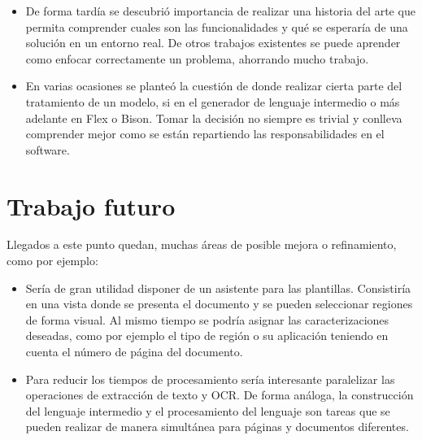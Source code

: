 \begin{itemize}
	\item De forma tardía se descubrió importancia de realizar una historia del arte que permita comprender cuales son las funcionalidades y qué se esperaría de una solución en un entorno real. De otros trabajos existentes se puede aprender como enfocar correctamente un problema, ahorrando mucho trabajo.
	\item En varias ocasiones se planteó la cuestión de donde realizar cierta parte del tratamiento de un modelo, si en el generador de lenguaje intermedio o más adelante en Flex o Bison. Tomar la decisión no siempre es trivial y conlleva comprender mejor como se están repartiendo las responsabilidades en el software.
\end{itemize}

\section{Trabajo futuro}

Llegados a este punto quedan, muchas áreas de posible mejora o refinamiento, como por ejemplo:

\begin{itemize}
	\item Sería de gran utilidad disponer de un asistente para las plantillas. Consistiría en una vista donde se presenta el documento y se pueden seleccionar regiones de forma visual. Al mismo tiempo se podría asignar las caracterizaciones deseadas, como por ejemplo el tipo de región o su aplicación teniendo en cuenta el número de página del documento.
	\item Para reducir los tiempos de procesamiento sería interesante paralelizar las operaciones de extracción de texto y OCR. De forma análoga, la construcción del lenguaje intermedio y el procesamiento del lenguaje son tareas que se pueden realizar de manera simultánea para páginas y documentos diferentes.
\end{itemize}
